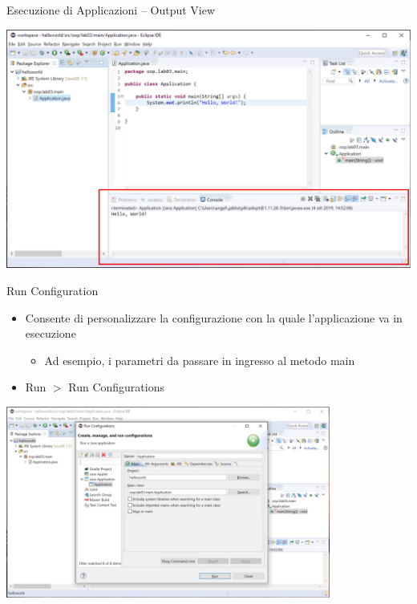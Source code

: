\documentclass[presentation]{beamer}
\begin{document}
\begin{frame}{Esecuzione di Applicazioni -- Output View}
\begin{center}
\includegraphics[width=\textwidth]{img/eclipse-screenshots/eclipse-ide-04c.jpg}
\end{center}
\end{frame}

\begin{frame}{Run Configuration}
\begin{itemize}
\item Consente di personalizzare la configurazione con la quale l'applicazione va in esecuzione
\begin{itemize}
\item Ad esempio, i parametri da passare in ingresso al metodo main
\end{itemize}
\item Run $>$ Run Configurations
\end{itemize}
\begin{center}
\includegraphics[width=0.8\textwidth]{img/eclipse-screenshots/eclipse-ide-04d.jpg}
\end{center}
\end{frame}
\end{document}
